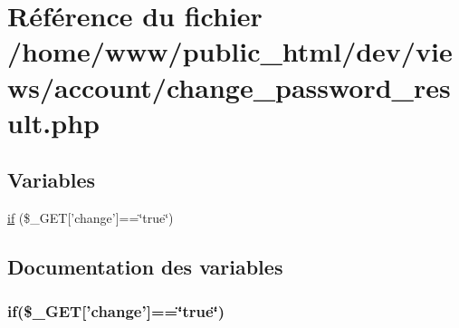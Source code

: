 \hypertarget{change__password__result_8php}{\section{Référence du fichier /home/www/public\-\_\-html/dev/views/account/change\-\_\-password\-\_\-result.php}
\label{change__password__result_8php}
}
\subsection*{Variables}
\begin{DoxyCompactItemize}
\item 
\hyperlink{change__password__result_8php_a44b25e25c394f8c5c40d86a99a2e31ab}{if} (\$\-\_\-\-G\-E\-T\mbox{[}'change'\mbox{]}==\char`\"{}true\char`\"{})
\end{DoxyCompactItemize}


\subsection{Documentation des variables}
\hypertarget{change__password__result_8php_a44b25e25c394f8c5c40d86a99a2e31ab}{
\subsubsection[{if}]{\setlength{\rightskip}{0pt plus 5cm}if(\$\-\_\-\-G\-E\-T\mbox{[}'change'\mbox{]}==\char`\"{}true\char`\"{})}}\label{change__password__result_8php_a44b25e25c394f8c5c40d86a99a2e31ab}
